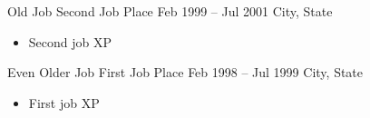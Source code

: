 \eventNode
{Old Job}
{Second Job Place}
{Feb 1999 -- Jul 2001}
{City, State}
\begin{itemize}
  \item Second job XP
\end{itemize}

\medskip

\eventNode
{Even Older Job}
{First Job Place}
{Feb 1998 -- Jul 1999}
{City, State}
\begin{itemize}
  \item First job XP
\end{itemize}
